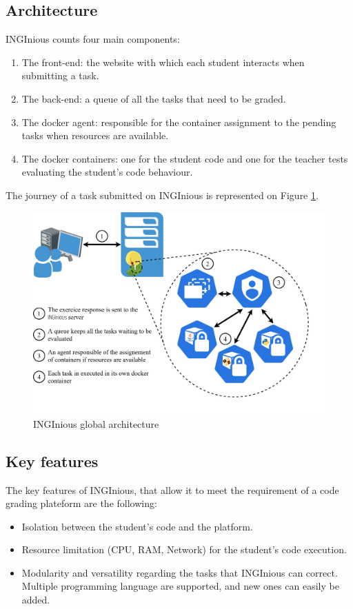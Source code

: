 \subsection{Architecture}
INGInious counts four main components:
\begin{enumerate}
  \item The front-end: the website with which each student interacts when submitting a task.
  \item The back-end: a queue of all the tasks that need to be graded.
  \item The docker agent: responsible for the container assignment to the pending tasks when resources are available.
  \item The docker containers: one for the student code and one for the teacher tests evaluating the student's code behaviour.
\end{enumerate}
The journey of a task submitted on INGInious is represented on Figure \ref{fig:architecture}.
\begin{figure}[!h]
  \begin{center}
    \includegraphics[width=\linewidth]{images/Architecture.png}
    \caption{INGInious global architecture}
    \label{fig:architecture}
  \end{center}
\end{figure}

\subsection{Key features}
The key features of INGInious, that allow it to meet the requirement of a code grading plateform are the following:
\begin{itemize}
  \item Isolation between the student's code and the platform.
  \item Resource limitation (CPU, RAM, Network) for the student's code execution.
  \item Modularity and versatility regarding the tasks that INGInious can correct.  Multiple programming language are supported, and new ones can easily be added.
\end{itemize}

